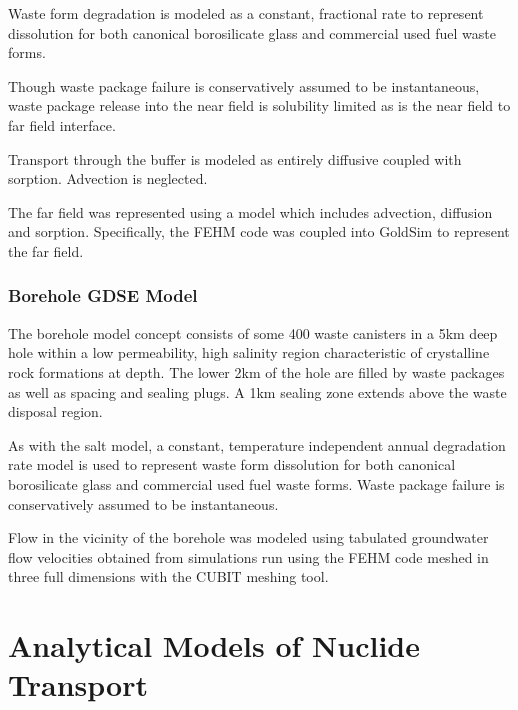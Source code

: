 Waste form degradation is modeled as a constant, fractional rate to represent 
dissolution for both canonical borosilicate glass and commercial used fuel 
waste forms.  

Though waste package failure is conservatively assumed to be instantaneous,
waste package release into the near field is solubility limited as is the near 
field to far field interface. 

Transport through the buffer is modeled as entirely diffusive coupled with 
sorption. Advection is neglected.

The far field was represented using a model which includes advection, diffusion 
and sorption. Specifically, the \gls{FEHM} code was coupled into GoldSim to 
represent the far field.

\subsubsection{ Borehole GDSE Model}

The borehole model concept consists of some 400 waste canisters in a 5km deep 
hole within a low permeability, high salinity region characteristic of 
crystalline rock formations at depth. The lower 2km of the hole are filled 
by waste packages as well as spacing and sealing plugs. A 1km sealing zone 
extends above the waste disposal region.

As with the salt model, a constant, temperature independent annual degradation
rate model is used to represent waste form dissolution for both canonical 
borosilicate glass and commercial used fuel waste forms. Waste package failure 
is conservatively assumed to be instantaneous.

Flow in the vicinity of the borehole was modeled using tabulated groundwater 
flow velocities obtained from simulations run using the \gls{FEHM} code 
meshed in three full dimensions with the \gls{CUBIT} meshing tool. 

\cite{nutt_generic_2011}

\section{Analytical Models of Nuclide Transport} \label{sec:analytical_nuc}



